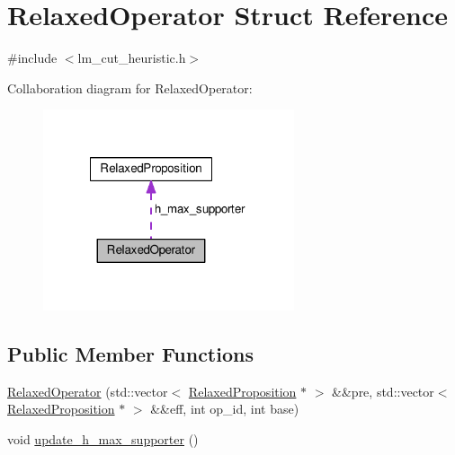 \hypertarget{structRelaxedOperator}{\section{Relaxed\-Operator Struct Reference}
\label{structRelaxedOperator}
}


{\ttfamily \#include $<$lm\-\_\-cut\-\_\-heuristic.\-h$>$}



Collaboration diagram for Relaxed\-Operator\-:
\nopagebreak
\begin{figure}[H]
\begin{center}
\leavevmode
\includegraphics[width=209pt]{structRelaxedOperator__coll__graph}
\end{center}
\end{figure}
\subsection*{Public Member Functions}
\begin{DoxyCompactItemize}
\item 
\hyperlink{structRelaxedOperator_ac97932e892e9a299ceff9e21a2382197}{Relaxed\-Operator} (std\-::vector$<$ \hyperlink{structRelaxedProposition}{Relaxed\-Proposition} $\ast$ $>$ \&\&pre, std\-::vector$<$ \hyperlink{structRelaxedProposition}{Relaxed\-Proposition} $\ast$ $>$ \&\&eff, int op\-\_\-id, int base)
\item 
void \hyperlink{structRelaxedOperator_a9083fbd3caa6fe272ccc8e9518cf80be}{update\-\_\-h\-\_\-max\-\_\-supporter} ()
\end{DoxyCompactItemize}
